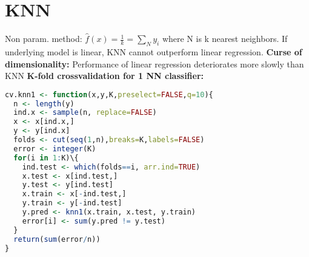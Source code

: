 \section{KNN}
Non param. method: $\hat f(x) = \frac{1}{k} = \sum_N y_i$ where N is k nearest neighbors. If underlying model is linear, KNN cannot outperform linear regression.
\textbf{Curse of dimensionality: } Performance of linear regression deteriorates more slowly than KNN
\textbf{K-fold crossvalidation for 1 NN classifier: }
\begin{lstlisting}[language = R]
cv.knn1 <- function(x,y,K,preselect=FALSE,q=10){
  n <- length(y)
  ind.x <- sample(n, replace=FALSE)
  x <- x[ind.x,]
  y <- y[ind.x]
  folds <- cut(seq(1,n),breaks=K,labels=FALSE)
  error <- integer(K)
  for(i in 1:K)\{
    ind.test <- which(folds==i, arr.ind=TRUE)
    x.test <- x[ind.test,]
    y.test <- y[ind.test]
    x.train <- x[-ind.test,]
    y.train <- y[-ind.test]
    y.pred <- knn1(x.train, x.test, y.train)  
    error[i] <- sum(y.pred != y.test)
  }
  return(sum(error/n))
}
\end{lstlisting}